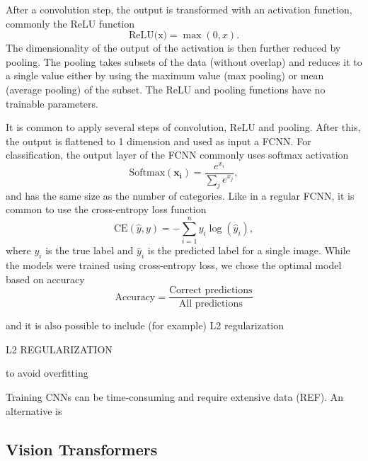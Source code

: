 After a convolution step, the output is transformed with an activation function, commonly the ReLU function
\begin{equation}
    \text{ReLU(x)} = \max(0,x).
\end{equation}
The dimensionality of the output of the activation is then further reduced by pooling. The pooling takes subsets of the data (without overlap) and reduces it to a single value either by using the maximum value (max pooling) or mean (average pooling) of the subset. The ReLU and pooling functions have no trainable parameters.

It is common to apply several steps of convolution, ReLU and pooling. After this, the output is flattened to 1 dimension and used as input a FCNN. For classification, the output layer of the FCNN commonly uses softmax activation
\begin{equation}
\label{eq:softmax}
\text{Softmax}(\mathbf{x_i}) = \frac{e^{x_i}}{\sum_{j} e^{x_j}},
\end{equation}
and has the same size as the number of categories. Like in a regular FCNN, it is common to use the cross-entropy loss function
\begin{equation}
\text{CE}(\hat{y}, y) = -\sum_{i=1}^{n} y_i \log(\hat{y}_i),
\end{equation}
where $y_i$ is the true label and $\hat{y}_i$ is the predicted label for a single image. While the models were trained using cross-entropy loss, we chose the optimal model based on accuracy
\begin{equation}
\text{Accuracy} = \frac{\text{Correct predictions}}{\text{All predictions}}
\end{equation}


and it is also possible to include (for example) L2 regularization

L2 REGULARIZATION

to avoid overfitting

Training CNNs can be time-consuming and require extensive data (REF). An alternative is 


\subsection{Vision Transformers} \label{ssec:vit}

